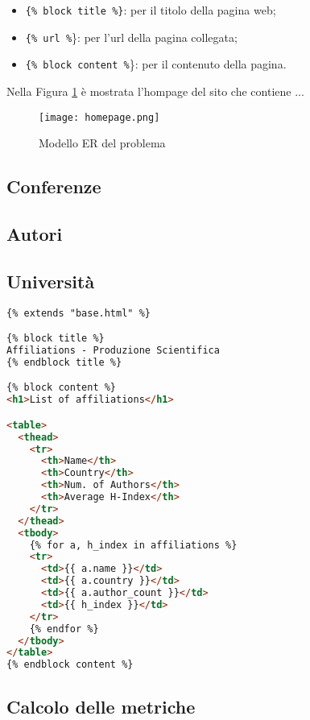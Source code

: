 \begin{itemize}
  \item \texttt{\{\% block title \%\}}: per il titolo della pagina web;
  \item \texttt{\{\% url \%}\}: per l'url della pagina collegata;
  \item \texttt{\{\% block content \%}\}: per il contenuto della pagina.
\end{itemize}

Nella Figura \ref{fig:homepage} è mostrata l'hompage del sito che contiene ... 

\begin{figure}
  \centering
  \texttt{[image: homepage.png]}
  \caption{Modello ER del problema}
  \label{fig:homepage}
\end{figure}

\subsection{Conferenze}

\subsection{Autori}

\subsection{Università}

\begin{lstlisting}[language=html, caption=Estratto di \texttt{template/affiliation.html}, label=lst:affiliation_html]
{% extends "base.html" %}

{% block title %}
Affiliations - Produzione Scientifica
{% endblock title %}

{% block content %}
<h1>List of affiliations</h1>

<table>
  <thead>
    <tr>
      <th>Name</th>
      <th>Country</th>
      <th>Num. of Authors</th>
      <th>Average H-Index</th>
    </tr>
  </thead>
  <tbody>
    {% for a, h_index in affiliations %}
    <tr>
      <td>{{ a.name }}</td>
      <td>{{ a.country }}</td>
      <td>{{ a.author_count }}</td>
      <td>{{ h_index }}</td>
    </tr>
    {% endfor %}
  </tbody>
</table>
{% endblock content %}

\end{lstlisting}

\subsection{Calcolo delle metriche}

